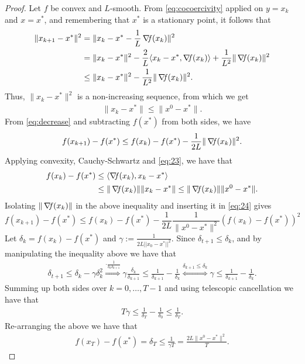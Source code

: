 \documentclass[10pt,a4paper]{article}
\begin{document}
\begin{proof}
	Let $f$ be convex and $L$-smooth. From \eqref{eq:cocoercivity} applied on $y=x_k$ and $x=x^*$, and remembering that $x^*$ is a stationary point, it follows that
	\begin{align*}
		\|x_{k+1} - x^*\|^2 &= \|x_k - x^* - \frac{1}{L}\operatorname*{\mathit{\nabla \!f}}(x_k)\|^2\\
		&= \|x_k - x^*\|^2 - \frac{2}{L}\langle x_k - x^*, \operatorname*{\mathit{\nabla \!f}}(x_k)\rangle + \frac{1}{L^2}\|\operatorname*{\mathit{\nabla \!f}}(x_k)\|^2\\
		&\leq \|x_k - x^*\|^2 - \frac{1}{L^2}\|\operatorname*{\mathit{\nabla \!f}}(x_k)\|^2.
	\end{align*}
	Thus, $\|x_k - x^*\|^2$ is a non-increasing sequence, from which we get 
	\begin{align}\label{eq:23}
		\|x_k - x^*\| \leq \|x^0 - x^*\|.
	\end{align}
	From \eqref{eq:decrease} and subtracting $f(x^*)$ from both sides, we have
	\begin{align}\label{eq:24}
		f(x_{k+1}) - f(x^*) \leq f(x_k) - f(x^*) - \frac{1}{2L}\|\operatorname*{\mathit{\nabla \!f}}(x_k)\|^2.
	\end{align}
	Applying convexity, Cauchy-Schwartz and \eqref{eq:23}, we have that
	\begin{equation*}
		\begin{split}
			f(x_k) - f(x^*) &\leq \langle \operatorname*{\mathit{\nabla \!f}}(x_k), x_k - x^* \rangle\\
			&\leq \|\operatorname*{\mathit{\nabla \!f}}(x_k)\|\|x_k - x^*\| \leq \|\operatorname*{\mathit{\nabla \!f}}(x_k)\|\|x^0 - x^*\|.
		\end{split}
	\end{equation*}
	Isolating $\|\operatorname*{\mathit{\nabla \!f}}(x_k)\|$ in the above inequality and inserting it in \eqref{eq:24} gives
	\begin{equation*}
		f(x_{k+1}) - f(x^*) \leq f(x_k) - f(x^*) - \frac{1}{2L}\frac{1}{\|x^0 - x^*\|^2}(f(x_k) - f(x^*))^2
	\end{equation*}
	Let $\delta_k = f(x_k) - f(x^*)$ and $\gamma:=\frac{1}{2L||x_0-x^*||^2}$. Since $\delta_{t+1} \leq \delta_k$, and by manipulating the inequality above we have that
	\begin{align*}
		\delta_{t+1} \leq \delta_k - \gamma\delta_k^2 \overset{\cdot\frac{1}{\delta_k\delta_{k+1}}}{\Rightarrow} \gamma\frac{\delta_k}{\delta_{k+1}} \leq \frac{1}{\delta_{k+1}} - \frac{1}{\delta_k} \overset{\delta_{k+1}\leq\delta_k}{\Leftrightarrow} \gamma \leq \frac{1}{\delta_{k+1}} - \frac{1}{\delta_k}.
	\end{align*}
	Summing up both sides over $k = 0, \ldots, T - 1$ and using telescopic cancellation we have that
	\begin{align*}
		T\gamma \leq \frac{1}{\delta_T} - \frac{1}{\delta_0} \leq \frac{1}{\delta_T}.
	\end{align*}
Re-arranging the above we have that
	\begin{align*}
		f(x_T) - f(x^*) = \delta_T \leq \frac{1}{\gamma T} = \frac{2L\|x^0 - x^*\|^2}{T}.
	\end{align*}
\end{proof}
\end{document}
